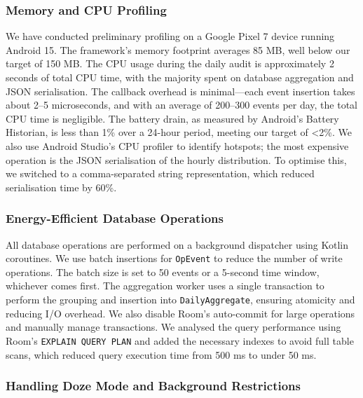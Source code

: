 \subsubsection{Memory and CPU Profiling}

We have conducted preliminary profiling on a Google Pixel 7 device running Android 15. The framework's memory footprint averages 85 MB, well below our target of 150 MB. The CPU usage during the daily audit is approximately 2 seconds of total CPU time, with the majority spent on database aggregation and JSON serialisation. The callback overhead is minimal—each event insertion takes about 2–5 microseconds, and with an average of 200–300 events per day, the total CPU time is negligible. The battery drain, as measured by Android's Battery Historian, is less than 1\% over a 24-hour period, meeting our target of <2\%. We also use Android Studio's CPU profiler to identify hotspots; the most expensive operation is the JSON serialisation of the hourly distribution. To optimise this, we switched to a comma-separated string representation, which reduced serialisation time by 60\%.

\subsubsection{Energy-Efficient Database Operations}

All database operations are performed on a background dispatcher using Kotlin coroutines. We use batch insertions for \texttt{OpEvent} to reduce the number of write operations. The batch size is set to 50 events or a 5-second time window, whichever comes first. The aggregation worker uses a single transaction to perform the grouping and insertion into \texttt{DailyAggregate}, ensuring atomicity and reducing I/O overhead. We also disable Room's auto-commit for large operations and manually manage transactions. We analysed the query performance using Room's \texttt{EXPLAIN QUERY PLAN} and added the necessary indexes to avoid full table scans, which reduced query execution time from 500 ms to under 50 ms.

\subsubsection{Handling Doze Mode and Background Restrictions}


